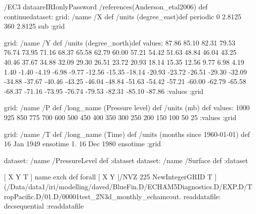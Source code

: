 \begin{ingrid}
/EC3 dataareIRIonlyPassword
/references(Anderson_etal2006) def
continuedataset:
grid:
/name /X def
/units (degree_east)def
 periodic
 0 2.8125 360  2.8125 sub
:grid

grid:
/name /Y def
/units (degree_north)def
values:
87.86 85.10 82.31 79.53 76.74 73.95 71.16 68.37
 65.58 62.79 60.00 57.21 54.42 51.63 48.84 46.04 43.25 40.46
 37.67 34.88 32.09 29.30 26.51 23.72 20.93 18.14 15.35 12.56
 9.77  6.98  4.19  1.40   -1.40   -4.19   -6.98   -9.77  -12.56  -15.35
 -18.14  -20.93  -23.72  -26.51  -29.30  -32.09  -34.88  -37.67  -40.46  -43.25
 -46.04  -48.84  -51.63  -54.42  -57.21  -60.00  -62.79  -65.58  -68.37  -71.16
 -73.95  -76.74  -79.53  -82.31  -85.10  -87.86
:values
:grid

grid:
/name /P def
/long_name (Pressure level) def
/units (mb) def
values:
1000 925 850 775 700 600 500 450 400 350 300 250 200 150 100 50 25
:values
:grid

grid:
/name /T def
/long_name (Time) def
/units (months since 1960-01-01) def
16 Jan 1949 ensotime
1.
16 Dec 1980 ensotime
:grid

dataset: /name /PressureLevel def :dataset
dataset: /name /Surface def :dataset

[ X Y T ] { name exch def } forall
[ X Y |/NVZ 225 NewIntegerGRID T ]
(/Data/data1/iri/modelling/daved/BlueFin.D/ECHAM5Diagnostics.D/EXP.D/TropPacific.D/01.D/00001test_2N3d_monthly_echamcout.%
readdatafile:
decsequential
:readdatafile


\end{ingrid}
